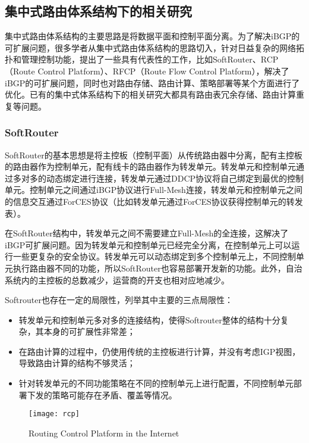 \subsection{集中式路由体系结构下的相关研究}

集中式路由体系结构的主要思路是将数据平面和控制平面分离。为了解决iBGP的可扩展问题，很多学者从集中式路由体系结构的思路切入，针对日益复杂的网络拓扑和管理控制功能，提出了一些具有代表性的工作，比如SoftRouter、RCP（Route Control Platform）、RFCP（Route Flow Control Platform），解决了iBGP的可扩展问题，同时也对路由存储、路由计算、策略部署等某个方面进行了优化。已有的集中式体系结构下的相关研究大都具有路由表冗余存储、路由计算重复等问题。

\subsubsection{SoftRouter\cite{lakshman2004}}
SoftRouter的基本思想是将主控板（控制平面）从传统路由器中分离，配有主控板的路由器作为控制单元，配有线卡的路由器作为转发单元。转发单元和控制单元通过多对多的动态绑定进行连接，转发单元通过DDCP协议将自己绑定到最优的控制单元。控制单元之间通过iBGP协议进行Full-Mesh连接，转发单元和控制单元之间的信息交互通过ForCES\cite{rfc3746}协议（比如转发单元通过ForCES协议获得控制单元的转发表）。

在SoftRouter结构中，转发单元之间不需要建立Full-Mesh的全连接，这解决了iBGP可扩展问题。因为转发单元和控制单元已经完全分离，在控制单元上可以运行一些更复杂的安全协议。转发单元可以动态绑定到多个控制单元上，不同控制单元执行路由器不同的功能，所以SoftRouter也容易部署开发新的功能。此外，自治系统内的主控板的总数减少，运营商的开支也相对应地减少。

Softrouter也存在一定的局限性，列举其中主要的三点局限性：
\begin{itemize}
  \item 转发单元和控制单元多对多的连接结构，使得Softrouter整体的结构十分复杂，其本身的可扩展性非常差；
  \item 在路由计算的过程中，仍使用传统的主控板进行计算，并没有考虑IGP视图，导致路由计算的结构不够灵活；
  \item 针对转发单元的不同功能策略在不同的控制单元上进行配置，不同控制单元部署下发的策略可能存在矛盾、覆盖等情况。
\end{itemize}

\begin{figure}
  \centering
  \texttt{[image: rcp]}
  \caption{Routing Control Platform in the Internet\cite{Feamster2004The}}
  \label{fig:rcp}
\end{figure}

